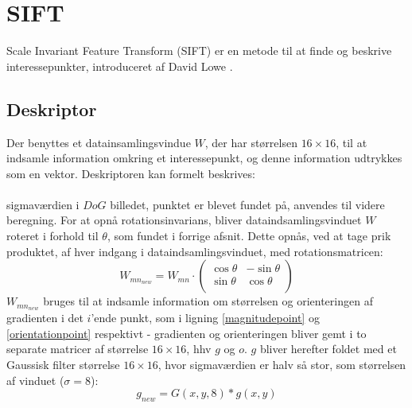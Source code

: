 \section{SIFT}
Scale Invariant Feature Transform (SIFT) er en metode til at finde og beskrive interessepunkter, introduceret af David Lowe \cite{SIFT}.


\subsection{Deskriptor}
Der benyttes et datainsamlingsvindue $W$, der har størrelsen $16 \times 16$, til at indsamle information omkring et interessepunkt, og denne information udtrykkes som en vektor. Deskriptoren kan formelt beskrives:
\\
\\
sigmaværdien i $DoG$ billedet, punktet er blevet fundet på, anvendes til videre beregning. For at opnå rotationsinvarians, bliver dataindsamlingsvinduet $W$ roteret i forhold til $\theta$, som fundet i forrige afsnit. Dette opnås, ved at tage prik produktet, af hver indgang i dataindsamlingsvinduet, med rotationsmatricen:
\begin{equation}
W_{{mn}_{new}} = W_{mn} \cdot
\begin{pmatrix}
  \cos \theta & -\sin \theta \\
  \sin \theta & \cos \theta  \\
\end{pmatrix}
\label{rotaionmatrix}
\end{equation}
$W_{{mn}_{new}}$ bruges til at indsamle information om størrelsen og orienteringen af gradienten i det $i$'ende punkt, som i ligning \eqref{magnitudepoint} og \eqref{orientationpoint} respektivt - gradienten og orienteringen bliver gemt i to separate matricer af størrelse $16\times16$, hhv $g$ og $o$. $g$ bliver herefter foldet med et Gaussisk filter størrelse $16\times16$, hvor sigmaværdien er halv så stor, som størrelsen af vinduet ($\sigma=8$):
\begin{equation}
g_{new} = G(x,y,8) * g(x,y)
\label{gradientsmooth}
\end{equation}

